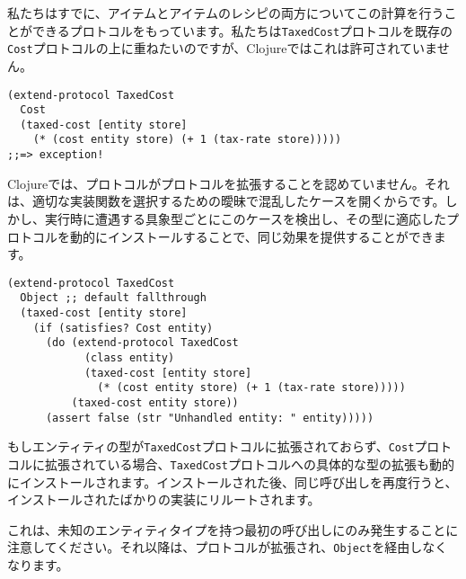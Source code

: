 私たちはすでに、アイテムとアイテムのレシピの両方についてこの計算を行うことができるプロトコルをもっています。私たちは\texttt{TaxedCost}プロトコルを既存の\texttt{Cost}プロトコルの上に重ねたいのですが、Clojureではこれは許可されていません。

\begin{lstlisting}[numbers=none]
(extend-protocol TaxedCost
  Cost
  (taxed-cost [entity store]
    (* (cost entity store) (+ 1 (tax-rate store)))))
;;=> exception!
\end{lstlisting}

Clojureでは、プロトコルがプロトコルを拡張することを認めていません。それは、適切な実装関数を選択するための曖昧で混乱したケースを開くからです。しかし、実行時に遭遇する具象型ごとにこのケースを検出し、その型に適応したプロトコルを動的にインストールすることで、同じ効果を提供することができます。

\begin{lstlisting}[numbers=none]
(extend-protocol TaxedCost
  Object ;; default fallthrough
  (taxed-cost [entity store]
    (if (satisfies? Cost entity)
      (do (extend-protocol TaxedCost
            (class entity)
            (taxed-cost [entity store]
              (* (cost entity store) (+ 1 (tax-rate store)))))
          (taxed-cost entity store))
      (assert false (str "Unhandled entity: " entity)))))
\end{lstlisting}

もしエンティティの型が\texttt{TaxedCost}プロトコルに拡張されておらず、\texttt{Cost}プロトコルに拡張されている場合、\texttt{TaxedCost}プロトコルへの具体的な型の拡張も動的にインストールされます。インストールされた後、同じ呼び出しを再度行うと、インストールされたばかりの実装にリルートされます。

これは、未知のエンティティタイプを持つ最初の呼び出しにのみ発生することに注意してください。それ以降は、プロトコルが拡張され、\texttt{Object}を経由しなくなります。

